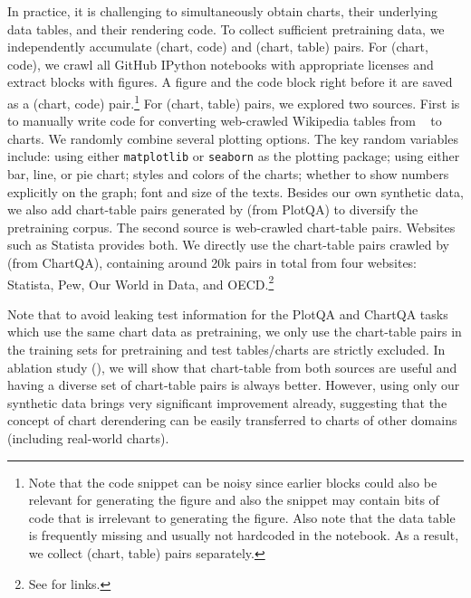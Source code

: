 In practice, it is challenging to simultaneously obtain charts, their underlying data tables, and their rendering code. To collect sufficient pretraining data, we independently accumulate (chart, code) and (chart, table) pairs. For (chart, code), we crawl all GitHub IPython notebooks with appropriate licenses and extract blocks with figures. A figure and the code block right before it are saved as a (chart, code) pair.\footnote{Note that the code snippet can be noisy since earlier blocks could also be relevant for generating the figure and also the snippet may contain bits of code that is irrelevant to generating the figure. Also note that the data table is frequently missing and usually not hardcoded in the notebook. As a result, we collect (chart, table) pairs separately.} For (chart, table) pairs, we explored two sources. First is to manually write code for converting web-crawled Wikipedia tables from ~\citet{herzig-etal-2020-tapas} to charts.
We randomly combine several plotting options. The key random variables include: using either \texttt{matplotlib} or \texttt{seaborn} as the plotting package; using either bar, line, or pie chart; styles and colors of the charts; whether to show numbers explicitly on the graph; font and size of the texts. Besides our own synthetic data, we also add chart-table pairs generated by %
\citet{methani2020plotqa} (from PlotQA) to diversify the pretraining corpus. The second source is web-crawled chart-table pairs. Websites such as Statista provides both. We directly use the chart-table pairs crawled by \citet{masry-etal-2022-chartqa} (from ChartQA), containing around 20k pairs in total from four websites: Statista, Pew, Our World in Data, and OECD.\footnote{See  for links.}

Note that to avoid leaking test information for the PlotQA and ChartQA tasks which use the same chart data as pretraining, we only use the chart-table pairs in the training sets for pretraining and test tables/charts are strictly excluded. In ablation study (), we will show that chart-table from both sources are useful and having a diverse set of chart-table pairs is always better. However, using only our synthetic data brings very significant improvement already, suggesting that the concept of chart derendering can be easily transferred to charts of other domains (including real-world charts).



